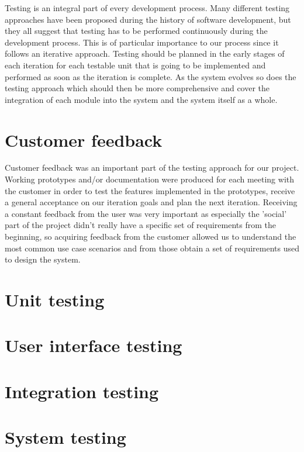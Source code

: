 
Testing is an integral part of every development process.
Many different testing approaches have been proposed during the history of
software development, but they all suggest that testing has to be performed continuously
during the development process. This is of particular importance to our process since
it follows an iterative approach. Testing should be planned in the early stages of each
iteration for each testable unit that is going to be implemented and performed as soon as
the iteration is complete. As the system evolves so does the testing approach which should
then be more comprehensive and cover the integration of each module into the system and the
system itself as a whole.

\section{Customer feedback}
Customer feedback was an important part of the testing approach for our project.
Working prototypes and/or documentation were produced for each meeting with the customer
in order to test the features implemented in the prototypes, receive a general acceptance
on our iteration goals and plan the next iteration. Receiving a constant feedback from the
user was very important as especially the 'social' part of the project didn't really have a
specific set of requirements from the beginning, so acquiring feedback from the customer allowed
us to understand the most common use case scenarios and from those obtain a set of requirements used
to design the system.

\section{Unit testing}

\section{User interface testing}

\section{Integration testing}

\section{System testing}
